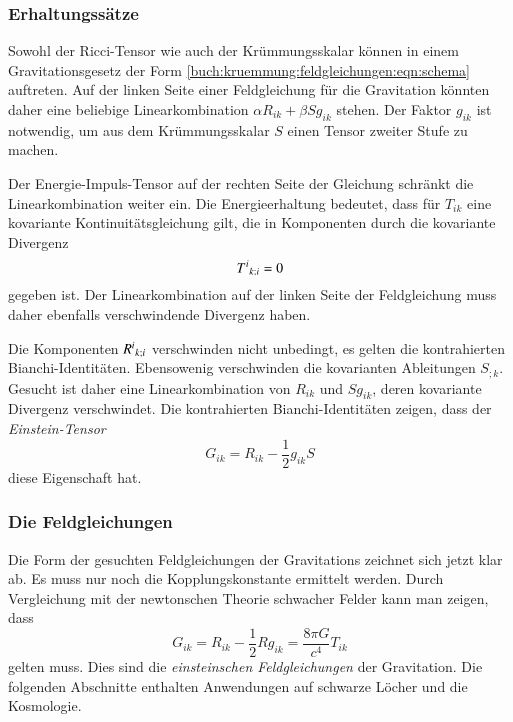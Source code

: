 %
%
\subsubsection{Erhaltungssätze}
Sowohl der Ricci-Tensor wie auch der Krümmungsskalar können in einem
Gravitationsgesetz der Form \eqref{buch:kruemmung:feldgleichungen:eqn:schema}
auftreten.
Auf der linken Seite einer Feldgleichung für die Gravitation könnten daher
eine beliebige Linearkombination $\alpha R_{ik}+\beta Sg_{ik}$ stehen.
Der Faktor $g_{ik}$ ist notwendig, um aus dem Krümmungsskalar $S$ einen
Tensor zweiter Stufe zu machen.

Der Energie-Impuls-Tensor auf der rechten Seite der Gleichung schränkt
die Linearkombination weiter ein.
Die Energieerhaltung bedeutet, dass für $T_{ik}$ eine kovariante 
Kontinuitätsgleichung gilt, die in Komponenten durch die kovariante
Divergenz
\[
T^i\mathstrut_{k;i}
=
0
\]
gegeben ist.
Der Linearkombination auf der linken Seite der Feldgleichung muss daher
ebenfalls verschwindende Divergenz haben.

Die Komponenten $R^i\mathstrut_{k;i}$ verschwinden nicht unbedingt,
es gelten die kontrahierten Bianchi-Identitäten.
Ebensowenig verschwinden die kovarianten Ableitungen $S_{;k}$.
Gesucht ist daher eine Linearkombination von $R_{ik}$ und $Sg_{ik}$,
deren kovariante Divergenz verschwindet.
Die kontrahierten Bianchi-Identitäten zeigen, dass  der
\emph{Einstein-Tensor}
\[
G_{ik}
=
R_{ik}
-\frac12 g_{ik}S
\]
diese Eigenschaft hat.

%
%
\subsubsection{Die Feldgleichungen}
Die Form der gesuchten Feldgleichungen der Gravitations zeichnet sich
jetzt klar ab.
Es muss nur noch die Kopplungskonstante ermittelt werden.
Durch Vergleichung mit der newtonschen Theorie schwacher Felder 
kann man zeigen, dass 
\begin{equation}
G_{ik}
=
R_{ik}
-
\frac12 Rg_{ik}
=
\frac{8\pi G}{c^4}T_{ik}
\label{buch:kruemmung:feldgleichung:eqn:feldgleichung}
\end{equation}
gelten muss.
Dies sind die \emph{einsteinschen Feldgleichungen} der Gravitation.
Die folgenden Abschnitte enthalten Anwendungen auf schwarze Löcher
und die Kosmologie.

